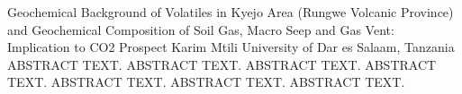 \begin{conf-abstract}
{Geochemical Background of Volatiles in Kyejo Area (Rungwe Volcanic Province) and Geochemical Composition of Soil Gas, Macro Seep and Gas Vent: Implication to CO2 Prospect}
{Karim Mtili}
{University of Dar es Salaam, Tanzania}
{ABSTRACT TEXT. ABSTRACT TEXT. ABSTRACT TEXT. ABSTRACT TEXT. ABSTRACT TEXT. ABSTRACT TEXT. ABSTRACT TEXT.}
\end{conf-abstract}
